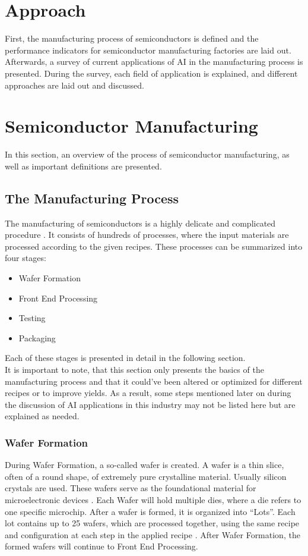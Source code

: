 \documentclass{Academic}
\begin{document}
    \section{Approach}
    First, the manufacturing process of semiconductors is defined and the performance indicators for semiconductor manufacturing factories are laid out. Afterwards, a survey of current applications of AI in the manufacturing process is presented. During the survey, each field of application is explained, and different approaches are laid out and discussed.

    \section{Semiconductor Manufacturing}
    In this section, an overview of the process of semiconductor manufacturing, as well as important definitions are presented.

    \subsection{The Manufacturing Process}
    The manufacturing of semiconductors is a highly delicate and complicated procedure \cite{noauthor_machine_nodate}. It consists of hundreds of processes, where the input materials are processed according to the given recipes. These processes can be summarized into four stages:
    \begin{itemize}
        \item Wafer Formation
        \item Front End Processing
        \item Testing
        \item Packaging
    \end{itemize}
    Each of these stages is presented in detail in the following section. \\
    It is important to note, that this section only presents the basics of the manufacturing process and that it could've been altered or optimized for different recipes or to improve yields. As a result, some steps mentioned later on during the discussion of AI applications in this industry may not be listed here but are explained as needed.

    \subsubsection{Wafer Formation}
    During Wafer Formation, a so-called wafer is created. A wafer is a thin slice, often of a round shape, of extremely pure crystalline material. Usually silicon crystals are used. These wafers serve as the foundational material for microelectronic devices \cite{susto_automatic_2012}. Each Wafer will hold multiple dies, where a die refers to one specific microchip. After a wafer is formed, it is organized into \enquote{Lots}. Each lot contains up to 25 wafers, which are processed together, using the same recipe and configuration at each step in the applied recipe \cite{susto_automatic_2012}. After Wafer Formation, the formed wafers will continue to Front End Processing.
\end{document}
